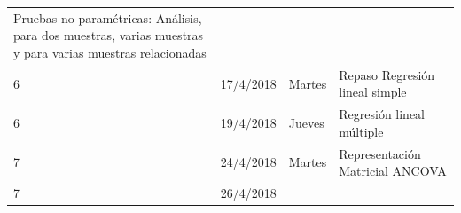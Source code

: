 \documentclass[]{book}
\theoremstyle{definition}
\theoremstyle{definition}
\theoremstyle{definition}
\theoremstyle{remark}
\begin{document}
\begin{longtable}[]{@{}llll@{}}
\begin{minipage}[t]{0.71\columnwidth}
Pruebas no paramétricas: Análisis, para dos muestras, varias muestras y
para varias muestras relacionadas\strut
\end{minipage}\tabularnewline
\begin{minipage}[t]{0.05\columnwidth}\raggedright
6\strut
\end{minipage} & \begin{minipage}[t]{0.07\columnwidth}\raggedright
17/4/2018\strut
\end{minipage} & \begin{minipage}[t]{0.05\columnwidth}\raggedright
Martes\strut
\end{minipage} & \begin{minipage}[t]{0.71\columnwidth}\raggedright
Repaso Regresión lineal simple\strut
\end{minipage}\tabularnewline
\begin{minipage}[t]{0.05\columnwidth}\raggedright
6\strut
\end{minipage} & \begin{minipage}[t]{0.07\columnwidth}\raggedright
19/4/2018\strut
\end{minipage} & \begin{minipage}[t]{0.05\columnwidth}\raggedright
Jueves\strut
\end{minipage} & \begin{minipage}[t]{0.71\columnwidth}\raggedright
Regresión lineal múltiple\strut
\end{minipage}\tabularnewline
\begin{minipage}[t]{0.05\columnwidth}\raggedright
7\strut
\end{minipage} & \begin{minipage}[t]{0.07\columnwidth}\raggedright
24/4/2018\strut
\end{minipage} & \begin{minipage}[t]{0.05\columnwidth}\raggedright
Martes\strut
\end{minipage} & \begin{minipage}[t]{0.71\columnwidth}\raggedright
Representación Matricial ANCOVA\strut
\end{minipage}\tabularnewline
\begin{minipage}[t]{0.05\columnwidth}\raggedright
7\strut
\end{minipage} & \begin{minipage}[t]{0.07\columnwidth}\raggedright
26/4/2018\strut
\end{minipage} & \begin{minipage}[t]{0.05\columnwidth}\raggedright

\end{minipage}
\end{longtable}
\end{document}

